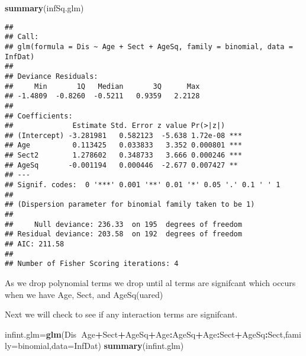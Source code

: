 \documentclass[]{article}
\newenvironment{Shaded}{\begin{snugshade}}{\end{snugshade}}
\newcommand{\KeywordTok}[1]{\textcolor[rgb]{0.13,0.29,0.53}{\textbf{#1}}}
\newcommand{\DataTypeTok}[1]{\textcolor[rgb]{0.13,0.29,0.53}{#1}}
\newcommand{\OperatorTok}[1]{\textcolor[rgb]{0.81,0.36,0.00}{\textbf{#1}}}
\newcommand{\NormalTok}[1]{#1}
\begin{document}
\begin{Shaded}
\begin{Highlighting}[]
\KeywordTok{summary}\NormalTok{(infSq.glm)}
\end{Highlighting}
\end{Shaded}

\begin{verbatim}
## 
## Call:
## glm(formula = Dis ~ Age + Sect + AgeSq, family = binomial, data = InfDat)
## 
## Deviance Residuals: 
##     Min       1Q   Median       3Q      Max  
## -1.4809  -0.8260  -0.5211   0.9359   2.2128  
## 
## Coefficients:
##              Estimate Std. Error z value Pr(>|z|)    
## (Intercept) -3.281981   0.582123  -5.638 1.72e-08 ***
## Age          0.113425   0.033833   3.352 0.000801 ***
## Sect2        1.278602   0.348733   3.666 0.000246 ***
## AgeSq       -0.001194   0.000446  -2.677 0.007427 ** 
## ---
## Signif. codes:  0 '***' 0.001 '**' 0.01 '*' 0.05 '.' 0.1 ' ' 1
## 
## (Dispersion parameter for binomial family taken to be 1)
## 
##     Null deviance: 236.33  on 195  degrees of freedom
## Residual deviance: 203.58  on 192  degrees of freedom
## AIC: 211.58
## 
## Number of Fisher Scoring iterations: 4
\end{verbatim}

As we drop polynomial terms we drop until al terms are signifcant which
occurs when we have Age, Sect, and AgeSq(uared)

Next we will check to see if any interaction terms are signifcant.

\begin{Shaded}
\begin{Highlighting}[]
\NormalTok{infint.glm=}\KeywordTok{glm}\NormalTok{(Dis}\OperatorTok{~}\NormalTok{Age}\OperatorTok{+}\NormalTok{Sect}\OperatorTok{+}\NormalTok{AgeSq}\OperatorTok{+}\NormalTok{Age}\OperatorTok{:}\NormalTok{AgeSq}\OperatorTok{+}\NormalTok{Age}\OperatorTok{:}\NormalTok{Sect}\OperatorTok{+}\NormalTok{AgeSq}\OperatorTok{:}\NormalTok{Sect,}\DataTypeTok{family=}\NormalTok{binomial,}\DataTypeTok{data=}\NormalTok{InfDat)}
\KeywordTok{summary}\NormalTok{(infint.glm)}
\end{Highlighting}
\end{Shaded}
\end{document}
